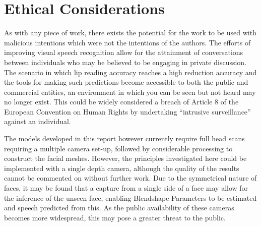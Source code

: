 \chapter*{Ethical Considerations}

As with any piece of work, there exists the potential for the work to be used with malicious intentions which were not the intentions of the authors.
The efforts of improving visual speech recognition allow for the attainment of conversations between individuals who may be believed to be engaging in private discussion.
The scenario in which lip reading accuracy reaches a high reduction accuracy and the tools for making such predictions become accessible to both the public and commercial entities, an environment in which you can be seen but not heard may no longer exist.
This could be widely considered a breach of Article 8 of the European Convention on Human Rights \cite{EuropeanConventiononHumanRights} by undertaking ``intrusive surveillance'' against an individual.

The models developed in this report however currently require full head scans requiring a multiple camera set-up, followed by considerable processing to construct the facial meshes.
However, the principles investigated here could be implemented with a single depth camera, although the quality of the results cannot be commented on without further work.
Due to the symmetrical nature of faces, it may be found that a capture from a single side of a face may allow for the inference of the unseen face, enabling Blendshape Parameters to be estimated and speech predicted from this.
As the public availability of these cameras becomes more widespread, this may pose a greater threat to the public.

